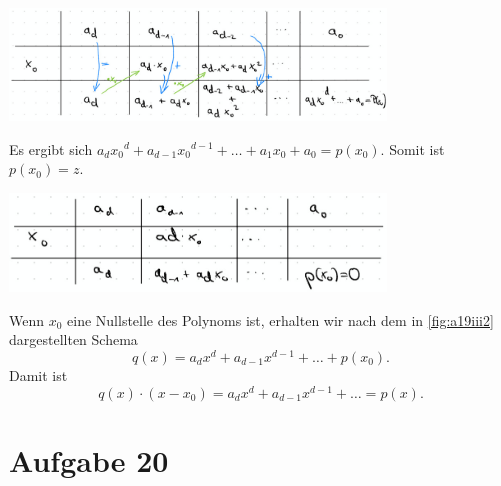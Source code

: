 \documentclass[12pt,a4paper]{article}
\begin{document}
\begin{enumerate}[(i)]
    \begin{minipage}{\linewidth}
        \centering
        \includegraphics[width=0.75\textwidth]{a19iii1.jpg}
        \label{fig:a19iii1}
    \end{minipage}
    Es ergibt sich $a_d {x_0}^d + a_{d-1} {x_0}^{d-1} + \ldots + a_1x_0 + a_0 = p(x_0)$.
    Somit ist $p(x_0) = z$.

    \begin{minipage}{\linewidth}
        \centering
        \includegraphics[width=0.75\textwidth]{a19iii2.jpg}
        \label{fig:a19iii2}
    \end{minipage}

    Wenn $x_0$ eine Nullstelle des Polynoms ist, erhalten wir nach dem in \autoref{fig:a19iii2} dargestellten Schema
    $$q(x) = a_d x^d + a_{d-1} x^{d-1} + \ldots + p(x_0).$$
    Damit ist
    $$q(x) \cdot (x - x_0) = a_d x^d + a_{d-1} x^{d-1} + \ldots = p(x).$$
\end{enumerate}


\section*{Aufgabe 20}
\end{document}
